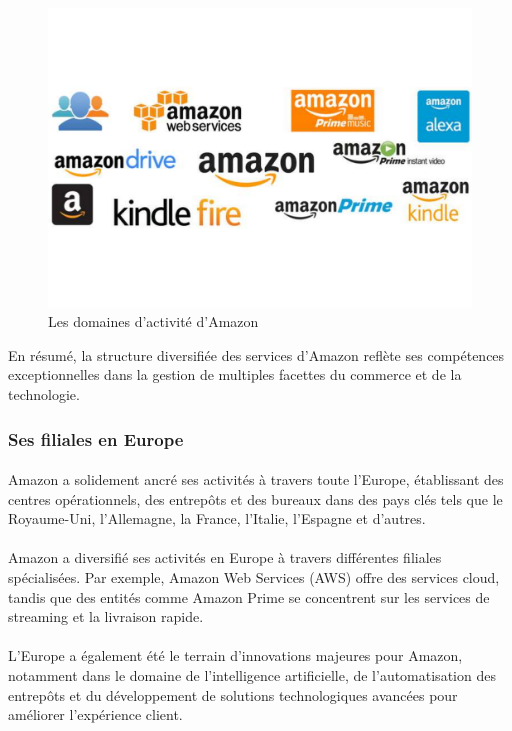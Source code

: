 \begin{figure}[htbp]
        \centering
        \includegraphics[width=0.8\linewidth]{./Graphismes-UTC/logos/Amazon/All-Things-Amazon.pdf}\hfill
        \caption{Les domaines d'activité d'Amazon}
    \end{figure}
En résumé, la structure diversifiée des services d'Amazon reflète ses compétences exceptionnelles dans la gestion de multiples facettes du commerce et de la technologie.


\subsubsection{Ses filiales en Europe}
\paragraph{}
\vspace{-2em}  %
Amazon a solidement ancré ses activités à travers toute l'Europe, établissant des centres opérationnels, des entrepôts et des bureaux dans des pays clés tels que le Royaume-Uni, l'Allemagne, la France, l'Italie, l'Espagne et d'autres.
\paragraph{}
\vspace{-2em}  %
Amazon a diversifié ses activités en Europe à travers différentes filiales spécialisées. Par exemple, Amazon Web Services (AWS) offre des services cloud, tandis que des entités comme Amazon Prime se concentrent sur les services de streaming et la livraison rapide.
\paragraph{}
\vspace{-2em}  %
L'Europe a également été le terrain d'innovations majeures pour Amazon, notamment dans le domaine de l'intelligence artificielle, de l'automatisation des entrepôts et du développement de solutions technologiques avancées pour améliorer l'expérience client.

